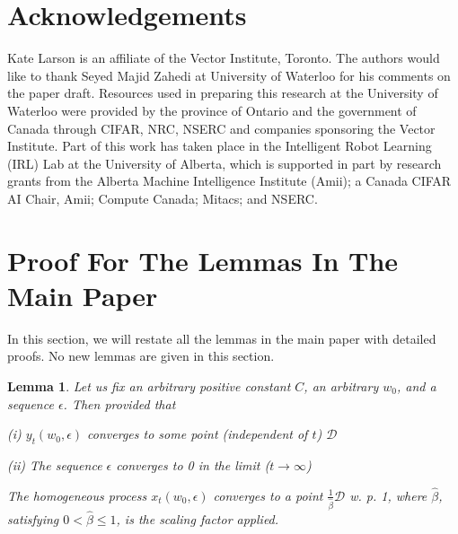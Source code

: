 \documentclass[jair, twoside,11pt,theapa]{article}
\newtheorem{lemm2}{Lemma}
\begin{document}
\section*{Acknowledgements}

Kate Larson is an affiliate of the Vector Institute, Toronto. The authors would like to thank Seyed Majid Zahedi at  University of Waterloo for his comments on the paper draft. Resources used in preparing this research at the University of Waterloo were provided by the province of Ontario and the government of Canada through CIFAR, NRC, NSERC and companies sponsoring the Vector Institute. Part of this work has taken place in the Intelligent Robot Learning (IRL) Lab at the University of Alberta, which is supported in part by research grants from the Alberta Machine Intelligence Institute (Amii); a Canada CIFAR AI Chair, Amii; Compute Canada; Mitacs; and NSERC.







\clearpage

\appendix


\section{Proof For The Lemmas In The Main Paper}\label{appendix:proofs}

In this section, we will restate all the lemmas in the main paper with detailed proofs. No new lemmas are given in this section. 

\begin{lemm2}
Let us fix an arbitrary positive constant $C$, an arbitrary $w_0$, and a sequence $\epsilon$. Then provided that 

(i) $ y_t(w_0, \epsilon)$ converges to some point (independent of $t$) $\mathcal{D}$ 

(ii) The sequence $\epsilon$ converges to 0 in the limit ($t \xrightarrow{} \infty$)

\noindent The homogeneous process $x_t(w_0, \epsilon)$ converges to a point $\frac{1}{\hat{\beta}} \mathcal{D}$ w. p. 1, where $\hat{\beta}$, satisfying $0 < \hat{\beta} \leq 1$, is the scaling factor applied.  
\end{lemm2}
\end{document}
